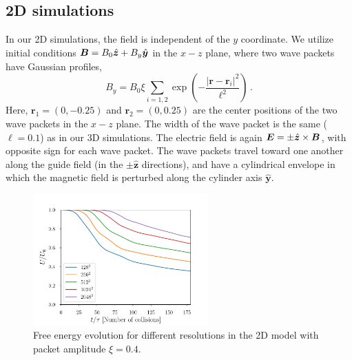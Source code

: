 \subsection{2D simulations}
\label{sec:spec_2d}
%
In our 2D simulations, the field is independent of the $y$ coordinate.
We utilize initial conditions
%
$\boldsymbol{B} = B_0\hat{\boldsymbol{z}}+ B_y\hat{\boldsymbol{y}}$ in the $x-z$ plane, where two \alfven wave packets have Gaussian profiles,
%
\begin{equation}
\label{eqn:2d-wave-packets}
	B_y =B_0 \xi \sum\limits_{i=1,2} \exp\left(- \frac{|\boldsymbol{r}-\boldsymbol{r}_i|^2}{\ell^2} \right) \, .
\end{equation}
%
Here, $\boldsymbol{r}_1 = (0,-0.25)$ and $\boldsymbol{r}_2 = (0,0.25)$ are the center positions of the two wave packets in the $x-z$ plane.
The width of the wave packet is the same ($\ell=0.1$) as in our 3D simulations.
The electric field is again $\boldsymbol{E} = \pm \hat{\boldsymbol{z}}\times \boldsymbol{B}$, with opposite sign for each wave packet. The wave packets travel toward one another along the guide field (in the $\pm \hat{\boldsymbol{z}}$ directions), and have a cylindrical envelope in which the magnetic field is perturbed along the cylinder axis $\hat {\boldsymbol{y}}$. 
%
\begin{figure}[h]
\centering
\includegraphics[width=0.6\textwidth]{pics/chap4/convergence2D}
\caption[Free energy evolution for different resolutions in the 2D model]{ Free energy evolution for different resolutions in the 2D model with packet amplitude $\xi=0.4$.}
\label{energy2D}
\end{figure}
%


